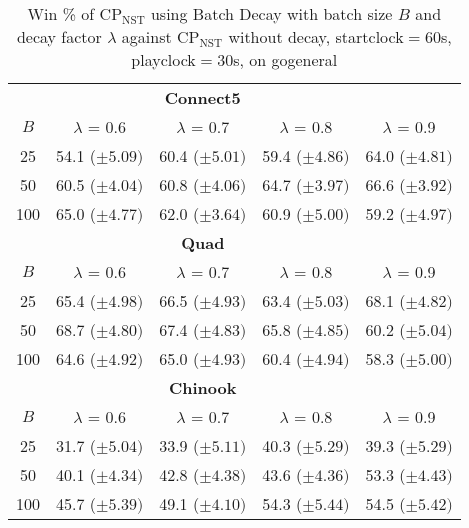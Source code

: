 \documentclass[journal]{IEEEtran}
\begin{document}
\begin{table}[h!]
\caption{Win \%  of CP$_{\textrm{NST}}$ using Batch Decay with batch size $B$ and decay factor $\lambda$ against CP$_{\textrm{NST}}$ without decay, startclock$=$60s, playclock$=$30s, on gogeneral}
\label{table:experimentBatchDecayLambda}
\centering
\begin{tabular}{|c|c|c|c|c|}
\hline
 & & \textbf{Connect5} & & \\

	$B$  & \textbf{$\lambda$} = 0.6 & \textbf{$\lambda$} = 0.7 & \textbf{$\lambda$} = 0.8 & \textbf{$\lambda$} = 0.9\\
\hline\hline
25  & 54.1 ($\pm 5.09)$ & 60.4 ($\pm 5.01)$ & 59.4 ($\pm 4.86)$ & 64.0 ($\pm 4.81)$\\ 
50  & 60.5 ($\pm 4.04)$ & 60.8 ($\pm 4.06)$ & 64.7 ($\pm 3.97)$ & 66.6 ($\pm 3.92)$\\ 
100 & 65.0 ($\pm 4.77)$ & 62.0 ($\pm 3.64)$ & 60.9 ($\pm 5.00)$ & 59.2 ($\pm 4.97)$\\ 
 \hline \hline
  & & \textbf{Quad} & & \\

	$B$  & \textbf{$\lambda$} = 0.6 & \textbf{$\lambda$} = 0.7 & \textbf{$\lambda$} = 0.8 & \textbf{$\lambda$} = 0.9\\
\hline\hline
25  & 65.4 ($\pm 4.98)$ & 66.5 ($\pm 4.93)$ & 63.4 ($\pm 5.03)$ & 68.1 ($\pm 4.82)$\\ 
50  & 68.7 ($\pm 4.80)$ & 67.4 ($\pm 4.83)$ & 65.8 ($\pm 4.85)$ & 60.2 ($\pm 5.04)$\\ 
100 & 64.6 ($\pm 4.92)$ & 65.0 ($\pm 4.93)$ & 60.4 ($\pm 4.94)$ & 58.3 ($\pm 5.00)$\\ 
 \hline  \hline
& & \textbf{Chinook} & & \\

	$B$  & \textbf{$\lambda$} = 0.6 & \textbf{$\lambda$} = 0.7 & \textbf{$\lambda$} = 0.8 & \textbf{$\lambda$} = 0.9\\
\hline\hline
25  & 31.7 ($\pm 5.04)$ & 33.9 ($\pm 5.11)$ & 40.3 ($\pm 5.29)$ & 39.3 ($\pm 5.29)$\\ 
50  & 40.1 ($\pm 4.34)$ & 42.8 ($\pm 4.38)$ & 43.6 ($\pm 4.36)$ & 53.3 ($\pm 4.43)$\\ 
100 & 45.7 ($\pm 5.39)$ & 49.1 ($\pm 4.10)$ & 54.3 ($\pm 5.44)$ & 54.5 ($\pm 5.42)$\\ 
 \hline 
\end{tabular}
\end{table}
\end{document}
